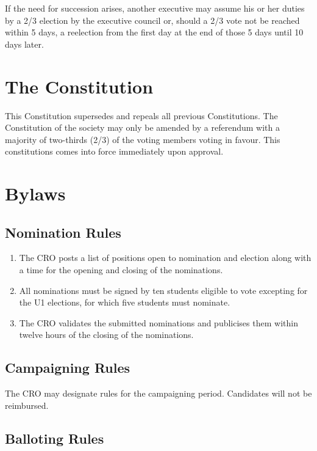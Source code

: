 If the need for succession arises, another executive may assume his or
her duties by a 2/3 election by the executive council or, should a 2/3
vote not be reached within 5 days, a reelection from the first day at
the end of those 5 days until 10 days later.

\section{The Constitution}\label{the-constitution}

This Constitution supersedes and repeals all previous Constitutions. The
Constitution of the society may only be amended by a referendum with a
majority of two-thirds (2/3) of the voting members voting in favour.
This constitutions comes into force immediately upon approval.

\section{Bylaws}\label{bylaws}

\subsection{Nomination Rules}\label{nomination-rules}

\begin{enumerate}
\def\labelenumi{\arabic{enumi}.}
\item
  The CRO posts a list of positions open to nomination and election
  along with a time for the opening and closing of the nominations.
\item
  All nominations must be signed by ten students eligible to vote
  excepting for the U1 elections, for which five students must nominate.
\item
  The CRO validates the submitted nominations and publicises them within
  twelve hours of the closing of the nominations.
\end{enumerate}

\subsection{Campaigning Rules}\label{campaigning-rules}

The CRO may designate rules for the campaigning period. Candidates will
not be reimbursed.

\subsection{Balloting Rules}\label{balloting-rules}

